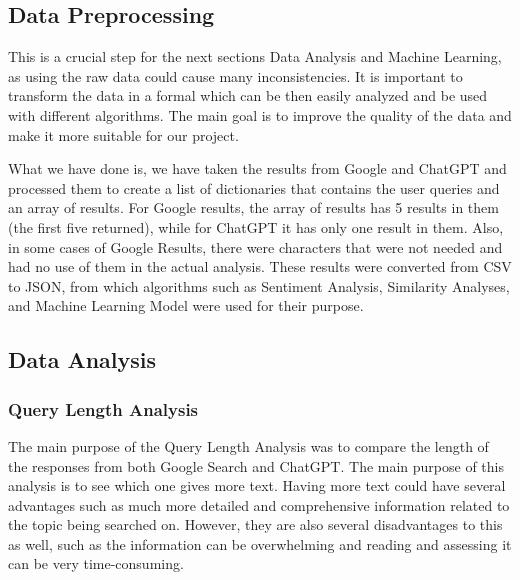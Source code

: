 \documentclass[50pt]{usiinfbachelorproject}
\begin{document}
\subsection{Data Preprocessing}
This is a crucial step for the next sections Data Analysis and Machine Learning, as using the raw data could cause many inconsistencies. It is important to transform the data in a formal which can be then easily analyzed and be used with different algorithms. The main goal is to improve the quality of the data and make it more suitable for our project. 

What we have done is, we have taken the results from Google and ChatGPT and processed them to create a list of dictionaries that contains the user queries and an array of results. For Google results, the array of results has 5 results in them (the first five returned), while for ChatGPT it has only one result in them. Also, in some cases of Google Results, there were characters that were not needed and had no use of them in the actual analysis. These results were converted from CSV to JSON, from which algorithms such as Sentiment Analysis, Similarity Analyses, and Machine Learning Model were used for their purpose.

\subsection{Data Analysis}
\subsubsection{Query Length Analysis}
The main purpose of the Query Length Analysis \cite{arampatzis2008study} was to compare the length of the responses from both Google Search and ChatGPT. The main purpose of this analysis is to see which one gives more text. Having more text could have several advantages such as much more detailed and comprehensive information related to the topic being searched on. However, they are also several disadvantages to this as well, such as the information can be overwhelming and reading and assessing it can be very time-consuming. \\
\end{document}
